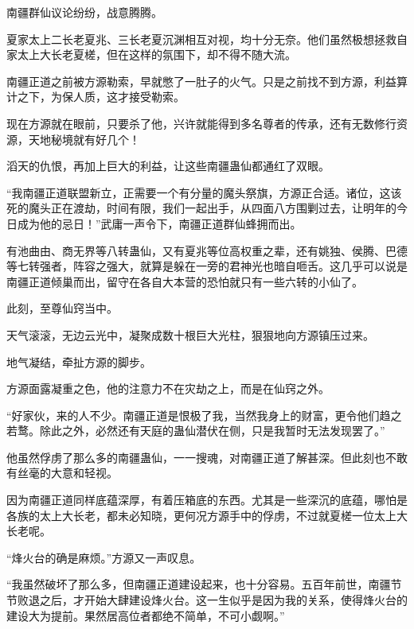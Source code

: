 \begin{this_body}
南疆群仙议论纷纷，战意腾腾。

夏家太上二长老夏兆、三长老夏沉渊相互对视，均十分无奈。他们虽然极想拯救自家太上大长老夏槎，但在这样的氛围下，却不得不随大流。

南疆正道之前被方源勒索，早就憋了一肚子的火气。只是之前找不到方源，利益算计之下，为保人质，这才接受勒索。

现在方源就在眼前，只要杀了他，兴许就能得到多名尊者的传承，还有无数修行资源，天地秘境就有好几个！

滔天的仇恨，再加上巨大的利益，让这些南疆蛊仙都通红了双眼。

“我南疆正道联盟新立，正需要一个有分量的魔头祭旗，方源正合适。诸位，这该死的魔头正在渡劫，时间有限，我们一起出手，从四面八方围剿过去，让明年的今日成为他的忌日！”武庸一声令下，南疆正道群仙蜂拥而出。

有池曲由、商无界等八转蛊仙，又有夏兆等位高权重之辈，还有姚独、侯腾、巴德等七转强者，阵容之强大，就算是躲在一旁的君神光也暗自咂舌。这几乎可以说是南疆正道倾巢而出，留守在各自大本营的恐怕就只有一些六转的小仙了。

此刻，至尊仙窍当中。

天气滚滚，无边云光中，凝聚成数十根巨大光柱，狠狠地向方源镇压过来。

地气凝结，牵扯方源的脚步。

方源面露凝重之色，他的注意力不在灾劫之上，而是在仙窍之外。

“好家伙，来的人不少。南疆正道是恨极了我，当然我身上的财富，更令他们趋之若鹜。除此之外，必然还有天庭的蛊仙潜伏在侧，只是我暂时无法发现罢了。”

他虽然俘虏了那么多的南疆蛊仙，一一搜魂，对南疆正道了解甚深。但此刻也不敢有丝毫的大意和轻视。

因为南疆正道同样底蕴深厚，有着压箱底的东西。尤其是一些深沉的底蕴，哪怕是各族的太上大长老，都未必知晓，更何况方源手中的俘虏，不过就夏槎一位太上大长老呢。

“烽火台的确是麻烦。”方源又一声叹息。

“我虽然破坏了那么多，但南疆正道建设起来，也十分容易。五百年前世，南疆节节败退之后，才开始大肆建设烽火台。这一生似乎是因为我的关系，使得烽火台的建设大为提前。果然居高位者都绝不简单，不可小觑啊。”

\end{this_body}

